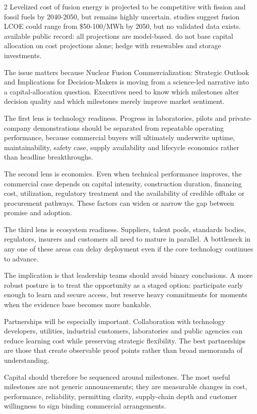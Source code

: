 \documentclass[10pt,a4paper]{article}
\begin{document}
\begin{multicols}{2}
{\small Levelized cost of fusion energy is projected to be competitive with fission and fossil fuels by 2040-2050, but remains highly uncertain. studies suggest fusion LCOE could range from \$50-100/MWh by 2050, but no validated data exists. available public record: all projections are model-based. do not base capital allocation on cost projections alone; hedge with renewables and storage investments.}\par
{\small The issue matters because Nuclear Fusion Commercialization: Strategic Outlook and Implications for Decision-Makers is moving from a science-led narrative into a capital-allocation question. Executives need to know which milestones alter decision quality and which milestones merely improve market sentiment.}\par
{\small The first lens is technology readiness. Progress in laboratories, pilots and private-company demonstrations should be separated from repeatable operating performance, because commercial buyers will ultimately underwrite uptime, maintainability, safety case, supply availability and lifecycle economics rather than headline breakthroughs.}\par
{\small The second lens is economics. Even when technical performance improves, the commercial case depends on capital intensity, construction duration, financing cost, utilization, regulatory treatment and the availability of credible offtake or procurement pathways. These factors can widen or narrow the gap between promise and adoption.}\par
{\small The third lens is ecosystem readiness. Suppliers, talent pools, standards bodies, regulators, insurers and customers all need to mature in parallel. A bottleneck in any one of these areas can delay deployment even if the core technology continues to advance.}\par
{\small The implication is that leadership teams should avoid binary conclusions. A more robust posture is to treat the opportunity as a staged option: participate early enough to learn and secure access, but reserve heavy commitments for moments when the evidence base becomes more bankable.}\par
{\small Partnerships will be especially important. Collaboration with technology developers, utilities, industrial customers, laboratories and public agencies can reduce learning cost while preserving strategic flexibility. The best partnerships are those that create observable proof points rather than broad memoranda of understanding.}\par
{\small Capital should therefore be sequenced around milestones. The most useful milestones are not generic announcements; they are measurable changes in cost, performance, reliability, permitting clarity, supply-chain depth and customer willingness to sign binding commercial arrangements.}\par
\end{multicols}
\end{document}
